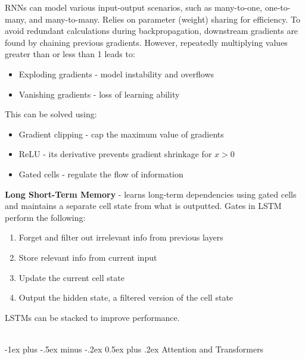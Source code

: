 \documentclass[10pt,landscape]{article}
\makeatletter
\renewcommand{\section}{\@startsection{section}{1}{0mm}%
                                {-1ex plus -.5ex minus -.2ex}%
                                {0.5ex plus .2ex}%
                                {\normalfont\large\bfseries}}
\makeatother
\begin{document}
\begin{multicols}{3}
    RNNs can model various input-output scenarios, such as many-to-one, one-to-many, and many-to-many. Relies on parameter (weight) sharing for efficiency. To avoid redundant calculations during backpropagation, downstream gradients are found by chaining previous gradients. However, repeatedly multiplying values greater than or less than 1 leads to:
    \begin{itemize}[label={--},leftmargin=4mm]
        \itemsep -.4mm
        \item Exploding gradients - model instability and overflows
        \item Vanishing gradients - loss of learning ability
    \end{itemize}
    This can be solved using:
    \begin{itemize}[label={--},leftmargin=4mm]
        \itemsep -.4mm
        \item Gradient clipping - cap the maximum value of gradients
        \item ReLU - its derivative prevents gradient shrinkage for $x > 0$
        \item Gated cells - regulate the flow of information
    \end{itemize}

    \textbf{Long Short-Term Memory} - learns long-term dependencies using gated cells and maintains a separate cell state from what is outputted. Gates in LSTM perform the following:

    \begin{enumerate}[leftmargin=5mm]
        \itemsep -.4mm
        \item Forget and filter out irrelevant info from previous layers
        \item Store relevant info from current input
        \item Update the current cell state
        \item Output the hidden state, a filtered version of the cell state
    \end{enumerate}
    LSTMs can be stacked to improve performance.

    \textcolor{white}{.}\vspace{-3mm}\\ %
    \section{Attention and Transformers}

\end{multicols}
\end{document}
